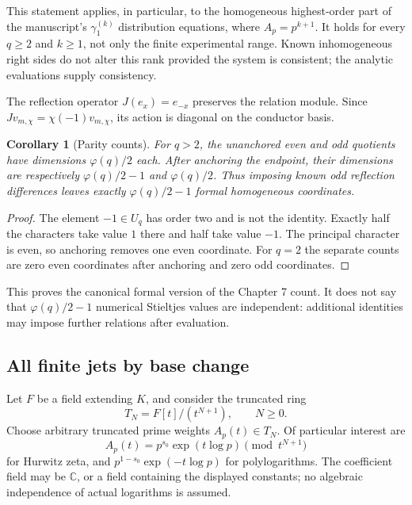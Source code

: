 \documentclass[11pt]{article}
\numberwithin{equation}{section}
\newtheorem{corollary}[theorem]{Corollary}
\theoremstyle{definition}
\theoremstyle{remark}
\newcommand{\C}{\mathbb C}
\begin{document}
This statement applies, in particular, to the homogeneous highest-order
part of the manuscript's $\gamma_1^{(k)}$ distribution equations, where
$A_p=p^{k+1}$. It holds for every $q\ge2$ and $k\ge1$, not only the
finite experimental range. Known inhomogeneous right sides do not alter
this rank provided the system is consistent; the analytic evaluations
supply consistency.

The reflection operator $J(e_x)=e_{-x}$ preserves the relation module.
Since $Jv_{m,\chi}=\chi(-1)v_{m,\chi}$, its action is diagonal on the
conductor basis.

\begin{corollary}[Parity counts]\label{cor:parity}
For $q>2$, the unanchored even and odd quotients have dimensions
$\varphi(q)/2$ each. After anchoring the endpoint, their dimensions are
respectively $\varphi(q)/2-1$ and $\varphi(q)/2$.
Thus imposing known odd reflection differences leaves exactly
$\varphi(q)/2-1$ formal homogeneous coordinates.
\end{corollary}
\begin{proof}
The element $-1\in U_q$ has order two and is not the identity. Exactly
half the characters take value $1$ there and half take value $-1$.
The principal character is even, so anchoring removes one even
coordinate. For $q=2$ the separate counts are zero even coordinates
after anchoring and zero odd coordinates.
\end{proof}

This proves the canonical formal version of the Chapter 7 count. It does
not say that $\varphi(q)/2-1$ numerical Stieltjes values are independent:
additional identities may impose further relations after evaluation.

\subsection{All finite jets by base change}
Let $F$ be a field extending $K$, and consider the truncated ring
\[
 T_N=F[t]/(t^{N+1}),\qquad N\ge0.
\]
Choose arbitrary truncated prime weights $A_p(t)\in T_N$. Of particular
interest are
\begin{equation}\label{eq:spectral-weight}
 A_p(t)=p^{s_0}\exp(t\log p)\pmod{t^{N+1}}
\end{equation}
for Hurwitz zeta, and $p^{1-s_0}\exp(-t\log p)$ for polylogarithms.
The coefficient field may be $\C$, or a field containing the displayed
constants; no algebraic independence of actual logarithms is assumed.
\end{document}
